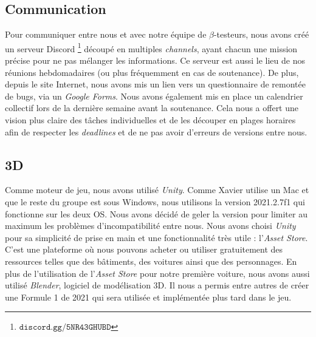 \documentclass[a4paper,12pt]{article}
\begin{document}
        \subsection{Communication}
            Pour communiquer entre nous et avec notre équipe de \(\beta\)-testeurs, nous
            avons créé un serveur Discord \footnote{\(\mathtt{discord.gg/5NR43GHUBD}\)}
            découpé en multiples 
            \textit{channels}, ayant chacun une mission précise pour ne pas mélanger les
            informations. Ce serveur est aussi le lieu de nos réunions hebdomadaires 
            (ou plus fréquemment en cas de soutenance). De plus, depuis le site Internet, nous
            avons mis un lien vers un questionnaire de remontée de bugs, via un \textsl{Google Forms}.
            Nous avons également mis en place un calendrier collectif lors de la
            dernière semaine avant la soutenance. Cela nous a offert une vision plus
            claire des tâches individuelles et de les découper en plages horaires afin de 
            respecter les \textit{deadlines} et de ne pas avoir d'erreurs de versions
            entre nous.

        \subsection{3D}
            Comme moteur de jeu, nous avons utilisé \textsl{Unity}. Comme Xavier utilise un Mac 
            et que le reste du groupe est sous Windows, nous utilisons la version 2021.2.7f1 qui
            fonctionne sur les deux OS. Nous avons décidé de geler la version pour limiter au
            maximum les problèmes d'incompatibilité entre nous. Nous avons choisi \textsl{Unity}
            pour sa simplicité de prise en main et une fonctionnalité très utile :
            l'\textsl{Asset Store}. C'est une plateforme où nous pouvons acheter ou
            utiliser gratuitement des ressources telles que des bâtiments, des voitures ainsi que
            des personnages. En plus de l'utilisation de l'\textsl{Asset Store} pour notre première
            voiture, nous avons aussi utilisé \textsl{Blender}, logiciel de modélisation 3D. Il
            nous a permis entre autres de créer une Formule 1 de 2021 qui sera utilisée et
            implémentée plus tard dans le jeu.
\end{document}

